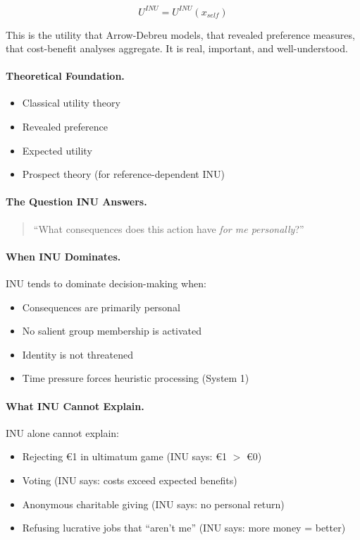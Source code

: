 \begin{equation}
U^{INU} = U^{INU}(x_{self})
\end{equation}

This is the utility that Arrow-Debreu models, that revealed preference measures,
that cost-benefit analyses aggregate. It is real, important, and well-understood.

\paragraph{Theoretical Foundation.}
\begin{itemize}
\item Classical utility theory \citep{vonneumann1944}
\item Revealed preference \citep{samuelson1938}
\item Expected utility \citep{savage1954}
\item Prospect theory (for reference-dependent INU) \citep{kahnemantversky1979}
\end{itemize}

\paragraph{The Question INU Answers.}
\begin{quote}
``What consequences does this action have \emph{for me personally}?''
\end{quote}

\paragraph{When INU Dominates.}
INU tends to dominate decision-making when:
\begin{itemize}
\item Consequences are primarily personal
\item No salient group membership is activated
\item Identity is not threatened
\item Time pressure forces heuristic processing (System 1)
\end{itemize}

\paragraph{What INU Cannot Explain.}
INU alone cannot explain:
\begin{itemize}
\item Rejecting \euro{1} in ultimatum game (INU says: \euro{1} $>$ \euro{0})
\item Voting (INU says: costs exceed expected benefits)
\item Anonymous charitable giving (INU says: no personal return)
\item Refusing lucrative jobs that ``aren't me'' (INU says: more money = better)
\end{itemize}

